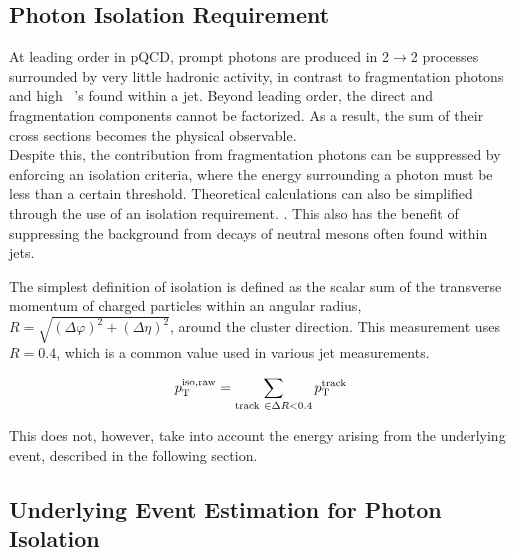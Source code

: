\subsection{Photon Isolation Requirement}
\label{sec:isolation}
At leading order in pQCD, prompt photons are produced in 2$\to$2 processes surrounded by very little hadronic activity, in contrast to fragmentation photons and high \pt~\pizero's found within a jet. Beyond leading order, the direct and fragmentation components cannot be factorized. As a result, the sum of their cross sections becomes the physical observable.\\

Despite this, the contribution from fragmentation photons can be suppressed by enforcing an isolation criteria, where the energy surrounding a photon must be less than a certain threshold. 
Theoretical calculations can also be simplified through the use of an isolation requirement. \cite{PhysRevD.82.014015}. This also has the benefit of suppressing the background from decays of neutral mesons often found within jets.

The simplest definition of isolation is defined as the scalar sum of the transverse momentum of charged particles within an angular radius, $R =\sqrt{(\Delta\varphi)^{2} +(\Delta\eta)^{2}  }$, around the cluster direction. This measurement uses $R = 0.4$, which is a common value used in various jet measurements.

\begin{equation}
p_{\mathrm{T}}^\mathrm{iso,raw} = \sum_{\mathrm{track}~\in\Delta R<0.4} p_{\mathrm{T}}^{\mathrm{track}}	
\end{equation}

This does not, however, take into account the energy arising from the underlying event, described in the following section.


\subsection{Underlying Event Estimation for Photon Isolation}
\label{sec:ue_isolation}

